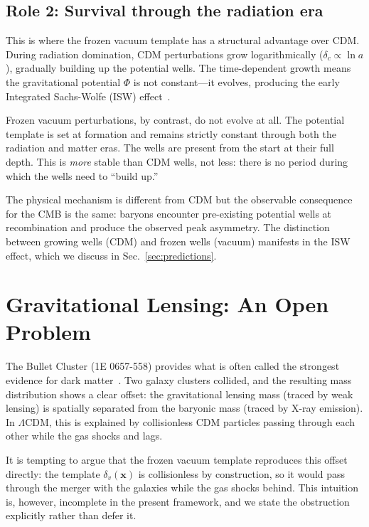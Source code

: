 \documentclass[12pt, a4paper]{article}
\begin{document}
\subsection{Role 2: Survival through the radiation era}

This is where the frozen vacuum template has a structural advantage over CDM. During radiation domination, CDM perturbations grow logarithmically ($\delta_c \propto \ln a$), gradually building up the potential wells. The time-dependent growth means the gravitational potential $\Phi$ is not constant---it evolves, producing the early Integrated Sachs-Wolfe (ISW) effect~\cite{dodelson_2003}.

Frozen vacuum perturbations, by contrast, do not evolve at all. The potential template is set at formation and remains strictly constant through both the radiation and matter eras. The wells are present from the start at their full depth. This is \emph{more} stable than CDM wells, not less: there is no period during which the wells need to ``build up.''

The physical mechanism is different from CDM but the observable consequence for the CMB is the same: baryons encounter pre-existing potential wells at recombination and produce the observed peak asymmetry. The distinction between growing wells (CDM) and frozen wells (vacuum) manifests in the ISW effect, which we discuss in Sec.~\ref{sec:predictions}.


\section{Gravitational Lensing: An Open Problem}
\label{sec:bullet}

The Bullet Cluster (1E 0657-558) provides what is often called the strongest evidence for dark matter~\cite{clowe_2006}. Two galaxy clusters collided, and the resulting mass distribution shows a clear offset: the gravitational lensing mass (traced by weak lensing) is spatially separated from the baryonic mass (traced by X-ray emission). In $\Lambda$CDM, this is explained by collisionless CDM particles passing through each other while the gas shocks and lags.

It is tempting to argue that the frozen vacuum template reproduces this offset directly: the template $\delta_v(\mathbf{x})$ is collisionless by construction, so it would pass through the merger with the galaxies while the gas shocks behind. This intuition is, however, incomplete in the present framework, and we state the obstruction explicitly rather than defer it.
\end{document}
